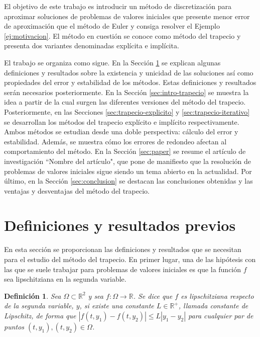 \documentclass{article}
\theoremstyle{theorem-style}  %
\theoremstyle{definition-style}
\newtheorem{definition}{Definición}[section]
\theoremstyle{example-style}
\begin{document}
	El objetivo de este trabajo es introducir un método de discretización para aproximar soluciones de problemas de valores iniciales que presente menor error de aproximación que el método de Euler y consiga resolver el Ejemplo \ref{ej:motivacion}. El método en cuestión se conoce como método del trapecio y presenta dos variantes denominadas explícita e implícita.

	El trabajo se organiza como sigue. En la Sección \ref{sec:previo} se explican algunas definiciones y resultados sobre la existencia y unicidad de las soluciones así como propiedades del error y estabilidad de los métodos. Estas definiciones y resultados serán necesarios posteriormente. En la Sección \ref{sec:intro-trapecio} se muestra la idea a partir de la cual surgen las diferentes versiones del método del trapecio. Posteriormente, en las Secciones \ref{sec:trapecio-explicito} y \ref{sec:trapecio-iterativo} se desarrollan los métodos del trapecio explícito e implícito respectivamente. Ambos métodos se estudian desde una doble perspectiva: cálculo del error y estabilidad. Además, se muestra cómo los errores de redondeo afectan al comportamiento del método. En la Sección \ref{sec:paper} se resume el artículo de investigación ``Nombre del artículo", que pone de manifiesto que la resolución de problemas de valores iniciales sigue siendo un tema abierto en la actualidad. Por último, en la Sección \ref{sec:conclusion} se destacan las conclusiones obtenidas y las ventajas y desventajas del método del trapecio.

\section{Definiciones y resultados previos} \label{sec:previo}

	En esta sección se proporcionan las definiciones y resultados que se necesitan para el estudio del método del trapecio. En primer lugar, una de las hipótesis con las que se suele trabajar para problemas de valores iniciales es que la función $f$ sea lipschitziana en la segunda variable.

	\begin{definition}
		Sea $\Omega \subset \mathbb{R}^2$ y sea $f : \Omega \rightarrow \mathbb{R}$. Se dice que $f$ es lipschitziana respecto de la segunda variable, $y$, si existe una constante $L \in \mathbb{R^{+}}$, llamada constante de Lipschitz, de forma que $|f(t,y_1) - f(t, y_2)| \le L|y_1 - y_2|$ para cualquier par de puntos $(t,y_1), (t,y_2) \in \Omega$.
	\end{definition}
\end{document}
